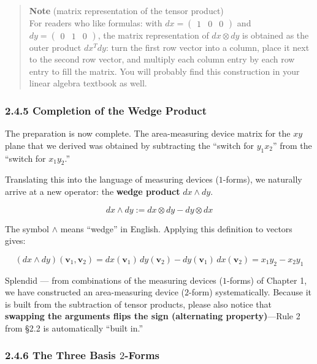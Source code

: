 \documentclass[a4paper,12pt,openany]{book}
\begin{document}
\begin{quote}
\textbf{Note} (matrix representation of the tensor product)\\
For readers who like formulas: with
\(dx = \begin{pmatrix} 1 & 0 & 0 \end{pmatrix}\) and
\(dy = \begin{pmatrix} 0 & 1 & 0 \end{pmatrix}\), the matrix
representation of \(dx \otimes dy\) is obtained as the outer product
\(dx^T dy\): turn the first row vector into a column, place it next to
the second row vector, and multiply each column entry by each row entry
to fill the matrix. You will probably find this construction in your
linear algebra textbook as well.
\end{quote}

\hypertarget{completion-of-the-wedge-product}{%
\subsubsection{2.4.5 Completion of the Wedge
Product}\label{completion-of-the-wedge-product}}

The preparation is now complete. The area-measuring device matrix for
the \(xy\) plane that we derived was obtained by subtracting the
``switch for \(y_1 x_2\)'' from the ``switch for \(x_1 y_2\).''

Translating this into the language of measuring devices (\(1\)-forms),
we naturally arrive at a new operator: the \textbf{wedge product}
\(dx \wedge dy\).

\[
dx \wedge dy := dx \otimes dy - dy \otimes dx
\]

The symbol \(\wedge\) means ``wedge'' in English. Applying this
definition to vectors gives:

\[
(dx \wedge dy)(\mathbf{v}_1, \mathbf{v}_2) = dx(\mathbf{v}_1)\,dy(\mathbf{v}_2) - dy(\mathbf{v}_1)\,dx(\mathbf{v}_2) = x_1 y_2 - x_2 y_1
\]

Splendid — from combinations of the measuring devices (\(1\)-forms) of
Chapter 1, we have constructed an area-measuring device (\(2\)-form)
systematically. Because it is built from the subtraction of tensor
products, please also notice that
\textbf{swapping the arguments flips the sign (alternating property)}—Rule
2 from §2.2 is automatically ``built in.''

\hypertarget{the-three-basis-2-forms}{%
\subsubsection{\texorpdfstring{2.4.6 The Three Basis
\(2\)-Forms}{2.4.6 The Three Basis 2-Forms}}\label{the-three-basis-2-forms}}
\end{document}

